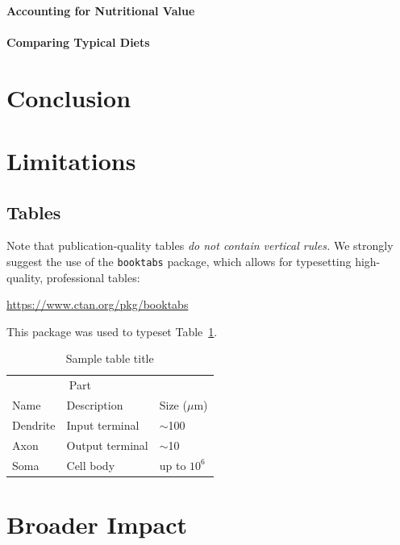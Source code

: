 \documentclass{article}
\begin{document}
\paragraph{Accounting  for Nutritional Value}
\paragraph{Comparing Typical Diets}

\section{Conclusion}
\label{conclusion}


\section{Limitations}
\label{limitations}

\subsection{Tables}



Note that publication-quality tables \emph{do not contain vertical rules.} We
strongly suggest the use of the \verb+booktabs+ package, which allows for
typesetting high-quality, professional tables:
\begin{center}
  \url{https://www.ctan.org/pkg/booktabs}
\end{center}
This package was used to typeset Table~\ref{sample-table}.

\begin{table}
  \caption{Sample table title}
  \label{sample-table}
  \centering
  \begin{tabular}{lll}
    \toprule
    \multicolumn{2}{c}{Part}                   \\
    \cmidrule(r){1-2}
    Name     & Description     & Size ($\mu$m) \\
    \midrule
    Dendrite & Input terminal  & $\sim$100     \\
    Axon     & Output terminal & $\sim$10      \\
    Soma     & Cell body       & up to $10^6$  \\
    \bottomrule
  \end{tabular}
\end{table}


\section*{Broader Impact}
\end{document}
